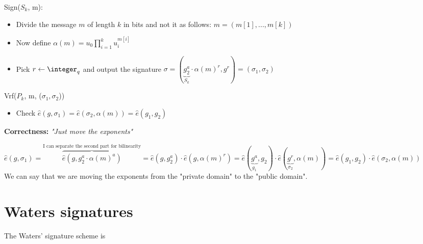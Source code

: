Sign($S_k$, m):
\begin{itemize}
    \item Divide the message $m$ of length $k$ in bits and not it as follows: $m=(m[1],...,m[k])$
    \item Now define $\alpha(m)=u_0\prod_{i=1}^k u_i^{m[i]}$
    \item Pick $r\leftarrow \integer_q$ and output the signature $\sigma =(\underbrace{g_2^a}_{S_k} \cdot \alpha(m)^r,g^r)=(\sigma_1,\sigma_2)$
\end{itemize}

Vrf($P_k$, m, ($\sigma_1,\sigma_2$))
\begin{itemize}
    \item Check $\hat{e}(g,\sigma_1)=\hat{e}(\sigma_2,\alpha(m))=\hat{e}(g_1,g_2)$
\end{itemize}

\textbf{Correctness:} \textit{"Just move the exponents"} 

$\hat{e}(g,\sigma_1)=\overbrace{\hat{e}(g,g_2^a\cdot \alpha(m)^a)}^{\text{I can separate the second part for bilinearity}}=\hat{e}(g,g_2^a)\cdot \hat{e}(g,\alpha(m)^r)=\hat{e}(\underbrace{g^a}_{g_1},g_2)\cdot \hat{e}(\underbrace{g^r}_{\sigma_2},\alpha(m))=\hat{e}(g_1,g_2)\cdot\hat{e}(\sigma_2,\alpha(m))$\\
We can say that we are moving the exponents from the "private domain" to the "public domain".

\section{Waters signatures}
\begin{theorem}
    The Waters' signature scheme is \ufcma
\end{theorem}

